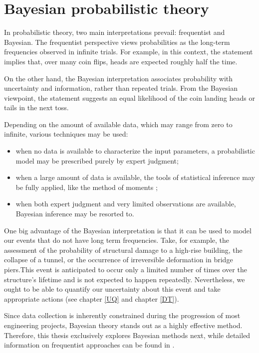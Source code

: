 \chapter{Bayesian probabilistic theory}


In probabilistic theory, two main interpretations prevail: frequentist and Bayesian. The frequentist perspective views probabilities as the long-term frequencies observed in infinite trials. For example, in this context, the statement implies that, over many coin flips, heads are expected roughly half the time.

On the other hand, the Bayesian interpretation associates probability with uncertainty and information, rather than repeated trials. From the Bayesian viewpoint, the statement suggests an equal likelihood of the coin landing heads or tails in the next toss.

Depending on the amount of available data, which may range from zero to infinite, various techniques may be used:

\begin{itemize}[left=0pt]
 \item when no data is available to characterize the input parameters, a probabilistic model may be prescribed purely by expert judgment;
 \item when a large amount of data is available, the tools of statistical inference may be fully applied, like the method of moments \citep{wagner2020};
 \item when both expert judgment and very limited observations are available, Bayesian inference may be resorted to.
\end{itemize}

One big advantage of the Bayesian interpretation is that it can be used to model our events that do not have long term frequencies. Take, for example, the assessment of the probability of structural damage to a high-rise building, the collapse of a tunnel, or the occurrence of irreversible deformation in bridge piers.This event is anticipated to occur only a limited number of times over the structure's lifetime and is not expected to happen repeatedly. Nevertheless, we ought to be able to quantify our uncertainty about this event and take appropriate actions (see chapter \ref{UQ} and chapter \ref{DT}).

Since data collection is inherently constrained during the progression of most engineering projects, Bayesian theory stands out as a highly effective method. Therefore, this thesis exclusively explores Bayesian methods next, while detailed information on frequentist approaches can be found in \cite{murphy2012}.



